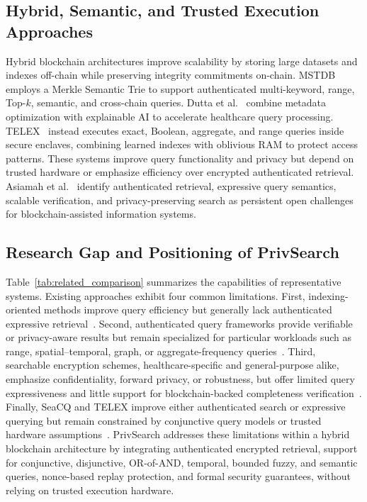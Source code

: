 \subsection{Hybrid, Semantic, and Trusted Execution Approaches}
\label{2D}

Hybrid blockchain architectures improve scalability by storing large datasets and indexes off-chain while preserving integrity commitments on-chain. MSTDB~\cite{Zhou} employs a Merkle Semantic Trie to support authenticated multi-keyword, range, Top-$k$, semantic, and cross-chain queries. Dutta et al.~\cite{Dutta} combine metadata optimization with explainable AI to accelerate healthcare query processing. TELEX~\cite{WuHaotian} instead executes exact, Boolean, aggregate, and range queries inside secure enclaves, combining learned indexes with oblivious RAM to protect access patterns. These systems improve query functionality and privacy but depend on trusted hardware or emphasize efficiency over encrypted authenticated retrieval. Asiamah et al.~\cite{Asiamah} identify authenticated retrieval, expressive query semantics, scalable verification, and privacy-preserving search as persistent open challenges for blockchain-assisted information systems.

\subsection{Research Gap and Positioning of PrivSearch}
\label{2E}

Table~\ref{tab:related_comparison} summarizes the capabilities of representative systems. Existing approaches exhibit four common limitations. First, indexing-oriented methods improve query efficiency but generally lack authenticated expressive retrieval~\cite{Lai,Hu,Lee,WuHaotianPeng}. Second, authenticated query frameworks provide verifiable or privacy-aware results but remain specialized for particular workloads such as range, spatial--temporal, graph, or aggregate-frequency queries~\cite{Yin,Xu,Wu,Liu,ChenBaochao,Ji}. Third, searchable encryption schemes, healthcare-specific and general-purpose alike, emphasize confidentiality, forward privacy, or robustness, but offer limited query expressiveness and little support for blockchain-backed completeness verification~\cite{LeeJoonYoung,Zhang,Yao,Lu,Li,Guo,Zheng}. Finally, SeaCQ and TELEX improve either authenticated search or expressive querying but remain constrained by conjunctive query models or trusted hardware assumptions~\cite{Yang,WuHaotian}. PrivSearch addresses these limitations within a hybrid blockchain architecture by integrating authenticated encrypted retrieval, support for conjunctive, disjunctive, OR-of-AND, temporal, bounded fuzzy, and semantic queries, nonce-based replay protection, and formal security guarantees, without relying on trusted execution hardware.

